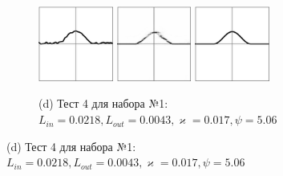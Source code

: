 \documentclass[12pt, a4paper]{article}
\renewcommand{\kappa}{\varkappa}
\begin{document}
\begin{figure}[!hp]
	\centering
	\begin{subfigure}{\textwidth}
		\centering
		\includegraphics[width=0.27\textwidth]{res_n1_7}
		\hfill
		\includegraphics[width=0.27\textwidth]{res_n1_8}
		\hfill
		\includegraphics[width=0.27\textwidth]{4}
		\caption*{\small (d) Тест 4 для набора №1: $L_{in} = 0.0218,
			 L_{out} = 0.0043,
			  \kappa = 0.017,
			   \psi = 5.06
			   $}
	\end{subfigure}
	

\end{figure}
\end{document}
